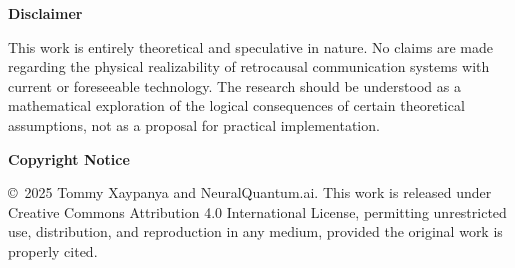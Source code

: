 \documentclass[12pt,a4paper]{article}
\begin{document}
\vspace{0.5cm}

\noindent\textbf{Disclaimer}

This work is entirely theoretical and speculative in nature. No claims are made regarding the physical realizability of retrocausal communication systems with current or foreseeable technology. The research should be understood as a mathematical exploration of the logical consequences of certain theoretical assumptions, not as a proposal for practical implementation.

\vspace{0.5cm}

\noindent\textbf{Copyright Notice}

\copyright\, 2025 Tommy Xaypanya and NeuralQuantum.ai. This work is released under Creative Commons Attribution 4.0 International License, permitting unrestricted use, distribution, and reproduction in any medium, provided the original work is properly cited.
\end{document}
